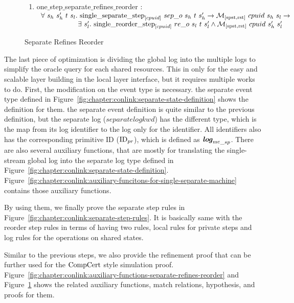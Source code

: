 \begin{figure}
\noindent{}
\begin{enumerate}
\item one$\_$step$\_$separate$\_$refines$\_$reorder : \\
$
\begin{array}{l}
\forall \ s_h \ s_h' \ t \ s_l . \ \singleseparatestep{cpuid}{sep\_o}{s_h}{t}{s_h'} \rightarrow  \matchspstaterstate{cpuid}{s_h}{s_l} \rightarrow \\
\ \ \ \ \ \ \ \ \ \ \ \ \ \ \ \ \exists\ s_l' . \  \singlereorderstep{cpuid}{re\_o}{s_l}{t}{s_l'} \wedge  \matchspstaterstate{cpuid}{s_h'}{s_l'}\\
\end{array}
$
\end{enumerate}
\caption{Separate Refines Reorder}
\label{fig:chapter:conlink:separate-refines-reorder}
\end{figure}
The last piece of optimization is 
dividing the global log into the multiple logs to simplify the oracle query for 
each shared resources. 
This in only for the easy and scalable layer building in the local layer interface, 
but it requires multiple works to do. 
First, 
the modification on the event type is necessary. 
the separate event type defined in Figure~\ref{fig:chapter:conlink:separate-state-definition}
shows the definition for them. 
the separate event definition is quite similar to the previous definition, 
but the separate log ($separatelogkwd$) has the different type,
 which is the map from its log identifier to the log only for the identifier. 
All identifiers also has the corresponding primitive ID (${\mathrm{ID}_{pr}}$), which is defined as ${{\mathrm{\textbf{\textit{log}}}_{\mathrm{mc}}}_{\_sp}}$.
There are also several auxiliary functions, 
that are mostly for translating the single-stream global log into the separate log type defined in Figure~\ref{fig:chapter:conlink:separate-state-definition}.
Figure~\ref{fig:chapter:conlink:auxiliary-funcitons-for-single-separate-machine} contains those auxiliary functions.

By using them, we finally prove the separate step rules in Figure~\ref{fig:chapter:conlink:separate-step-rules}. 
It is basically same with the reorder step rules in terms of 
having two rules, local rules for private steps and log rules for the operations on shared states. 

Similar to the previous steps, 
we also provide the refinement proof that can be further used for 
the $\mathrm{CompCert}$ style simulation proof. 
Figure~\ref{fig:chapter:conlink:auxiliary-functions-separate-refines-reorder} and 
Figure~\ref{fig:chapter:conlink:separate-refines-reorder} shows 
the related auxiliary functions, match relations, hypothesis, and proofs for them.

